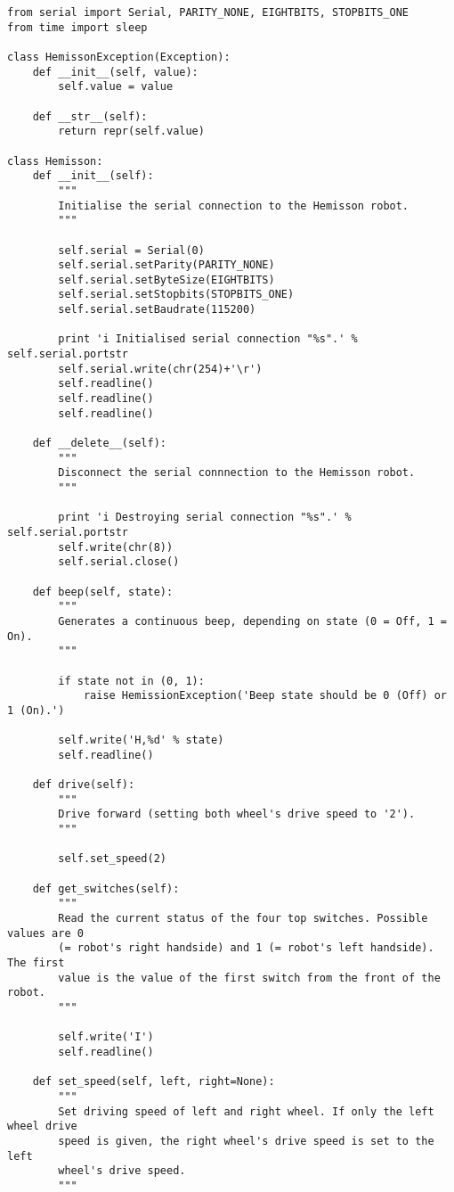 \documentclass[a4paper, 12pt, titlepage]{article}
\begin{document}
\begin{verbatim}
from serial import Serial, PARITY_NONE, EIGHTBITS, STOPBITS_ONE
from time import sleep

class HemissonException(Exception):
    def __init__(self, value):
        self.value = value

    def __str__(self):
        return repr(self.value)

class Hemisson:
    def __init__(self):
        """
        Initialise the serial connection to the Hemisson robot.
        """

        self.serial = Serial(0)
        self.serial.setParity(PARITY_NONE)
        self.serial.setByteSize(EIGHTBITS)
        self.serial.setStopbits(STOPBITS_ONE)
        self.serial.setBaudrate(115200)

        print 'i Initialised serial connection "%s".' % self.serial.portstr
        self.serial.write(chr(254)+'\r')
        self.readline()
        self.readline()
        self.readline()

    def __delete__(self):
        """
        Disconnect the serial connnection to the Hemisson robot.
        """

        print 'i Destroying serial connection "%s".' % self.serial.portstr
        self.write(chr(8))
        self.serial.close()

    def beep(self, state):
        """
        Generates a continuous beep, depending on state (0 = Off, 1 = On).
        """

        if state not in (0, 1):
            raise HemissionException('Beep state should be 0 (Off) or 1 (On).')

        self.write('H,%d' % state)
        self.readline()

    def drive(self):
        """
        Drive forward (setting both wheel's drive speed to '2').
        """

        self.set_speed(2)

    def get_switches(self):
        """
        Read the current status of the four top switches. Possible values are 0
        (= robot's right handside) and 1 (= robot's left handside). The first
        value is the value of the first switch from the front of the robot.
        """

        self.write('I')
        self.readline()

    def set_speed(self, left, right=None):
        """
        Set driving speed of left and right wheel. If only the left wheel drive
        speed is given, the right wheel's drive speed is set to the left
        wheel's drive speed.
        """


\end{verbatim}
\end{document}
